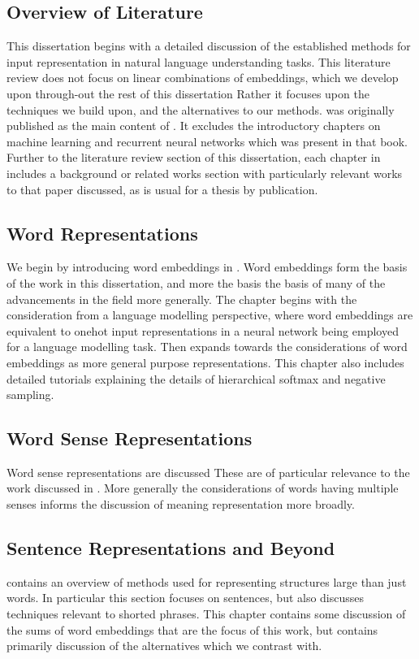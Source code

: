 \documentclass{book}
\begin{document}
\subsection{Overview of Literature}
This dissertation begins with a detailed discussion of the established methods for input representation in natural language understanding tasks.
This literature review does not focus on linear combinations of embeddings, which we develop upon through-out the rest of this dissertation
Rather it focuses upon the techniques we build upon, and the alternatives to our methods.
 was originally published as the main content of \citet{NRoNL}.
It excludes the introductory chapters on machine learning and recurrent neural networks which was present in that book.
Further to the literature review section of this dissertation, each chapter in  includes a background or related works section with particularly relevant works to that paper discussed, as is usual for a thesis by publication.



\subsection{ Word Representations}
We begin by introducing word embeddings in .
Word embeddings form the basis of the work in this dissertation, and more the basis the basis of many of the advancements in the field more generally.
The chapter begins with the consideration from a language modelling perspective,
where word embeddings are equivalent to onehot input representations in a neural network being employed for a language modelling task.
Then expands towards the considerations of word embeddings as more general purpose representations.
This chapter also includes detailed tutorials explaining the details of hierarchical softmax and negative sampling.


\subsection{ Word Sense Representations}
Word sense representations are discussed 
These are of particular relevance to the work discussed in .
More generally the considerations of words having multiple senses informs the discussion of meaning representation more broadly.

\subsection{ Sentence Representations and Beyond}
 contains an overview of methods used for representing structures large than just words.
In particular this section focuses on sentences, but also discusses techniques relevant to shorted phrases.
This chapter contains some discussion of the sums of word embeddings that are the focus of this work,
but contains primarily discussion of the alternatives which we contrast with.
\end{document}
